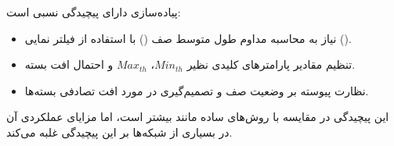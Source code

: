 \begin{enumerate}
	\begin{qsolve}
		پیاده‌سازی  دارای پیچیدگی نسبی است:
		\begin{itemize}
			\item نیاز به محاسبه مداوم طول متوسط صف () با استفاده از فیلتر نمایی ().
			\item تنظیم مقادیر پارامترهای کلیدی نظیر $Min_{th}$، $Max_{th}$ و احتمال افت بسته.
			\item نظارت پیوسته بر وضعیت صف و تصمیم‌گیری در مورد افت تصادفی بسته‌ها.
		\end{itemize}
		این پیچیدگی در مقایسه با روش‌های ساده مانند  بیشتر است، اما مزایای عملکردی آن در بسیاری از شبکه‌ها بر این پیچیدگی غلبه می‌کند.
		
	\end{qsolve}
\end{enumerate}
\newpage



